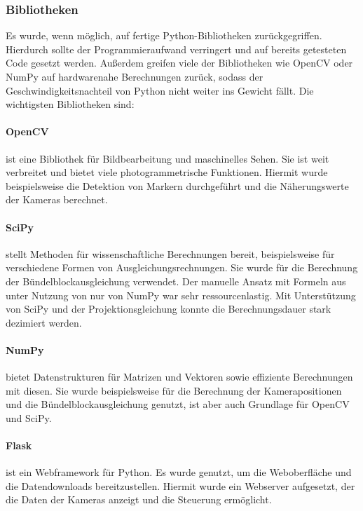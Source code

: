 \documentclass[./00PhotoBox.tex]{subfiles}
\begin{document}
\subsubsection{Bibliotheken}
Es wurde, wenn möglich, auf fertige Python-Bibliotheken zurückgegriffen. Hierdurch sollte der Programmieraufwand verringert und auf bereits getesteten Code gesetzt werden. Außerdem greifen viele der Bibliotheken wie OpenCV oder NumPy auf hardwarenahe Berechnungen zurück, sodass der Geschwindigkeitsnachteil von Python nicht weiter ins Gewicht fällt. Die wichtigsten Bibliotheken sind:

\paragraph{OpenCV}
ist eine Bibliothek für Bildbearbeitung und maschinelles Sehen. Sie ist weit verbreitet und bietet viele photogrammetrische Funktionen. Hiermit wurde beispielsweise die Detektion von Markern durchgeführt und die Näherungswerte der Kameras berechnet.

\paragraph{SciPy}
stellt Methoden für wissenschaftliche Berechnungen bereit, beispielsweise für verschiedene Formen von Ausgleichungsrechnungen. Sie wurde für die Berechnung der Bündelblockausgleichung verwendet. Der manuelle Ansatz mit Formeln aus \citet[S. 349ff]{luhmann} unter Nutzung von nur von NumPy war sehr ressourcenlastig. Mit Unterstützung von SciPy und der Projektionsgleichung konnte die Berechnungsdauer stark dezimiert werden.

\paragraph{NumPy}
bietet Datenstrukturen für Matrizen und Vektoren sowie effiziente Berechnungen mit diesen. Sie wurde beispielsweise für die Berechnung der Kamerapositionen und die Bündelblockausgleichung genutzt, ist aber auch Grundlage für OpenCV und SciPy.


\paragraph{Flask}
ist ein Webframework für Python. Es wurde genutzt, um die Weboberfläche und die Datendownloads bereitzustellen. Hiermit wurde ein Webserver aufgesetzt, der die Daten der Kameras anzeigt und die Steuerung ermöglicht.
\end{document}
